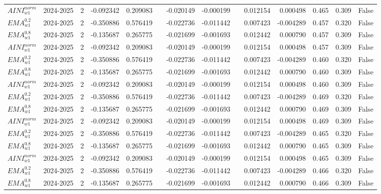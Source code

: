\begin{tabular}{@{}llrrrrrrrrrlll@{}}
$AINI^{norm}_{w1}$ & 2024-2025 & 2 & -0.092342 & 0.209083 &  & -0.020149 & -0.000199 &  & 0.012154 & 0.000498 & 0.465 & 0.309 & False \\
$EMA^{0.2}_{w1}$ & 2024-2025 & 2 & -0.350886 & 0.576419 &  & -0.022736 & -0.011442 &  & 0.007423 & -0.004289 & 0.457 & 0.320 & False \\
$EMA^{0.8}_{w1}$ & 2024-2025 & 2 & -0.135687 & 0.265775 &  & -0.021699 & -0.001693 &  & 0.012442 & 0.000790 & 0.457 & 0.309 & False \\
$AINI^{norm}_{w1}$ & 2024-2025 & 2 & -0.092342 & 0.209083 &  & -0.020149 & -0.000199 &  & 0.012154 & 0.000498 & 0.457 & 0.309 & False \\
$EMA^{0.2}_{w1}$ & 2024-2025 & 2 & -0.350886 & 0.576419 &  & -0.022736 & -0.011442 &  & 0.007423 & -0.004289 & 0.460 & 0.320 & False \\
$EMA^{0.8}_{w1}$ & 2024-2025 & 2 & -0.135687 & 0.265775 &  & -0.021699 & -0.001693 &  & 0.012442 & 0.000790 & 0.460 & 0.309 & False \\
$AINI^{norm}_{w1}$ & 2024-2025 & 2 & -0.092342 & 0.209083 &  & -0.020149 & -0.000199 &  & 0.012154 & 0.000498 & 0.460 & 0.309 & False \\
$EMA^{0.2}_{w1}$ & 2024-2025 & 2 & -0.350886 & 0.576419 &  & -0.022736 & -0.011442 &  & 0.007423 & -0.004289 & 0.469 & 0.320 & False \\
$EMA^{0.8}_{w1}$ & 2024-2025 & 2 & -0.135687 & 0.265775 &  & -0.021699 & -0.001693 &  & 0.012442 & 0.000790 & 0.469 & 0.309 & False \\
$AINI^{norm}_{w1}$ & 2024-2025 & 2 & -0.092342 & 0.209083 &  & -0.020149 & -0.000199 &  & 0.012154 & 0.000498 & 0.469 & 0.309 & False \\
$EMA^{0.2}_{w1}$ & 2024-2025 & 2 & -0.350886 & 0.576419 &  & -0.022736 & -0.011442 &  & 0.007423 & -0.004289 & 0.465 & 0.320 & False \\
$EMA^{0.8}_{w1}$ & 2024-2025 & 2 & -0.135687 & 0.265775 &  & -0.021699 & -0.001693 &  & 0.012442 & 0.000790 & 0.465 & 0.309 & False \\
$AINI^{norm}_{w1}$ & 2024-2025 & 2 & -0.092342 & 0.209083 &  & -0.020149 & -0.000199 &  & 0.012154 & 0.000498 & 0.465 & 0.309 & False \\
$EMA^{0.2}_{w1}$ & 2024-2025 & 2 & -0.350886 & 0.576419 &  & -0.022736 & -0.011442 &  & 0.007423 & -0.004289 & 0.466 & 0.320 & False \\
$EMA^{0.8}_{w1}$ & 2024-2025 & 2 & -0.135687 & 0.265775 &  & -0.021699 & -0.001693 &  & 0.012442 & 0.000790 & 0.466 & 0.309 & False \\

\end{tabular}
